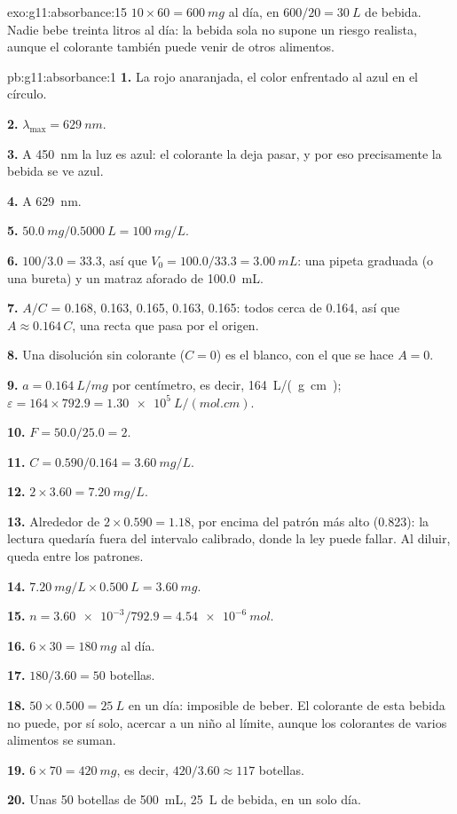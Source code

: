 \begin{solution}{exo:g11:absorbance:15}
$10 \times 60 = \qty{600}{mg}$ al día, en $600 / 20 = \qty{30}{L}$ de
bebida. Nadie bebe treinta litros al día: la bebida sola no supone un
riesgo realista, aunque el colorante también puede venir de otros
alimentos.
\end{solution}

\begin{solution}{pb:g11:absorbance:1}
\textbf{1.} La rojo anaranjada, el color enfrentado al azul en el
círculo.

\textbf{2.} $\lambda_{\max} = \qty{629}{nm}$.

\textbf{3.} A \qty{450}{nm} la luz es azul: el colorante la deja pasar,
y por eso precisamente la bebida se ve azul.

\textbf{4.} A \qty{629}{nm}.

\textbf{5.} $\qty{50.0}{mg} / \qty{0.5000}{L} = \qty{100}{mg/L}$.

\textbf{6.}  $100 / 3.0 = 33.3$, así que
$V_0 = 100.0 / 33.3 = \qty{3.00}{mL}$: una pipeta graduada (o una
bureta) y un matraz aforado de \qty{100.0}{mL}.

\textbf{7.} $A/C$ = 0.168, 0.163, 0.165, 0.163, 0.165: todos cerca de
0.164, así que $A \approx 0.164\, C$, una recta que pasa por el origen.

\textbf{8.} Una disolución sin colorante ($C = 0$) es el blanco, con el
que se hace $A = 0$.

\textbf{9.} $a = \qty{0.164}{L/mg}$ por centímetro, es decir,
\qty{164}{L/(g.cm)}; $\varepsilon = 164 \times 792.9 =
\qty{1.30e5}{L/(mol.cm)}$.

\textbf{10.} $F = 50.0 / 25.0 = 2$.

\textbf{11.} $C = 0.590 / 0.164 = \qty{3.60}{mg/L}$.

\textbf{12.} $2 \times 3.60 = \qty{7.20}{mg/L}$.

\textbf{13.} Alrededor de $2 \times 0.590 = 1.18$, por encima del patrón
más alto (0.823): la lectura quedaría fuera del intervalo calibrado,
donde la ley puede fallar. Al diluir, queda entre los patrones.

\textbf{14.} $\qty{7.20}{mg/L} \times \qty{0.500}{L} = \qty{3.60}{mg}$.

\textbf{15.} $n = \num{3.60e-3} / 792.9 = \qty{4.54e-6}{mol}$.

\textbf{16.} $6 \times 30 = \qty{180}{mg}$ al día.

\textbf{17.} $180 / 3.60 = 50$ botellas.

\textbf{18.} $50 \times 0.500 = \qty{25}{L}$ en un día: imposible de
beber. El colorante de esta bebida no puede, por sí solo, acercar a un
niño al límite, aunque los colorantes de varios alimentos se suman.

\textbf{19.} $6 \times 70 = \qty{420}{mg}$, es decir,
$420 / 3.60 \approx
117$ botellas.

\textbf{20.} Unas 50 botellas de \qty{500}{mL}, \qty{25}{L} de bebida,
en un solo día.
\end{solution}
